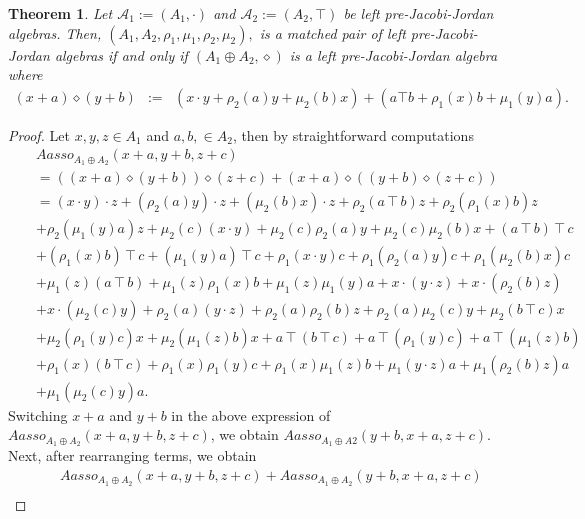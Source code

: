\documentclass[12pt]{amsart}
\newtheorem{theorem}[Theorem]{Theorem}
\begin{document}
	\begin{theorem}
		Let $\mathcal{A}_1:=(A_1,\cdot)$ and 
		$\mathcal{A}_2:=(A_2,\top)$ be left pre-Jacobi-Jordan algebras. Then,
		$(A_1,A_2,\rho_1,\mu_1,\rho_2,\mu_2),$ is a matched pair of left pre-Jacobi-Jordan algebras if and only if  $(A_1\oplus A_2, \diamond)$ is a left pre-Jacobi-Jordan algebra where
		\begin{eqnarray}
			(x+a)\diamond(y+b)&:=&(x\cdot y+\rho_2(a)y+\mu_2(b)x)+(a\top b+\rho_1(x)b+\mu_1(y)a). \label{oppHJJ1}
		\end{eqnarray}
	\end{theorem}
	\begin{proof} Let $x,y,z\in A_1$ and $a,b,\in A_2$, then by straightforward computations
		\begin{eqnarray}
			&& Aasso_{A_1\oplus A_2}(x+a,y+b,z+c)\nonumber\\
			&&=((x+a)\diamond(y+b))\diamond(z+c)+
			(x+a)\diamond((y+b)\diamond(z+c))\nonumber\\
			&&=(x\cdot y)\cdot z+(\rho_2(a)y)\cdot z+(\mu_2(b)x)\cdot z+\rho_2(a\intercal b)z+\rho_2(\rho_1(x)b)z\nonumber\\
			&&+\rho_2(\mu_1(y)a)z+\mu_2(c)(x\cdot y)+\mu_2(c)\rho_2(a)y+\mu_2(c)\mu_2(b)x+(a\intercal b)\intercal c\nonumber\\
			&&+(\rho_1(x)b)\intercal c+(\mu_1(y)a)\intercal c+\rho_1(x\cdot y)c+\rho_1(\rho_2(a)y)c
			+\rho_1(\mu_2(b)x)c\nonumber\\
			&&+\mu_1(z)(a\intercal b)+\mu_1(z)\rho_1(x)b+\mu_1(z)\mu_1(y)a
			+x\cdot(y\cdot z)+x\cdot(\rho_2(b)z)\nonumber\\
			&&+x\cdot(\mu_2(c)y)+\rho_2(a)(y\cdot z)+\rho_2(a)\rho_2(b)z+\rho_2(a)\mu_2(c)y+\mu_2(b\intercal c)x\nonumber\\
			&&+\mu_2(\rho_1(y)c)x+\mu_2(\mu_1(z)b)x
			+a\intercal(b\intercal c)+a\intercal(\rho_1(y)c)
			+a\intercal(\mu_1(z)b)\nonumber\\
			&&+\rho_1(x)(b\intercal c)+\rho_1(x)\rho_1(y)c+\rho_1(x)\mu_1(z)b+\mu_1(y\cdot z)a+\mu_1(\rho_2(b)z)a\nonumber\\
			&&+\mu_1(\mu_2(c)y)a.\nonumber
		\end{eqnarray}
		Switching $x+a$ and $y+b$ in the above expression of $Aasso_{A_1\oplus A_2}(x+a,y+b,z+c)$, we obtain  $Aasso_{A_1\oplus A2}(y+b,x+a,z+c).$
		Next, after rearranging terms, we obtain
		\begin{eqnarray}
			&&Aasso_{A_1\oplus A_2}(x+a,y+b,z+c)+Aasso_{A_1\oplus A_2}(y+b,x+a,z+c)\nonumber\\

\end{eqnarray}
\end{proof}
\end{document}
